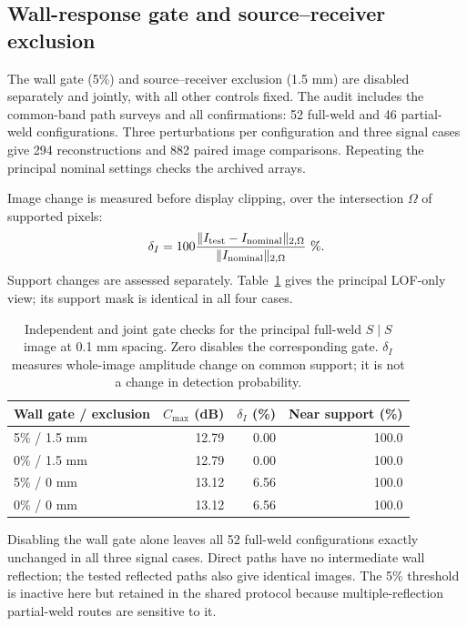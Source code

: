 \subsection{Wall-response gate and source--receiver exclusion}
\label{saftapp:archive:full:gate_audit}
The wall gate (5\%) and source--receiver exclusion (1.5 mm) are disabled separately and jointly, with all other controls fixed. The audit includes the common-band path surveys and all confirmations: 52 full-weld and 46 partial-weld configurations. Three perturbations per configuration and three signal cases give 294 reconstructions and 882 paired image comparisons. Repeating the principal nominal settings checks the archived arrays.

Image change is measured before display clipping, over the intersection $\Omega$ of supported pixels:
\begin{equation}
 \delta_I=100\frac{\lVert I_{\rm test}-I_{\rm nominal}\rVert_{2,\Omega}}
 {\lVert I_{\rm nominal}\rVert_{2,\Omega}}\ \%.
\end{equation}
Support changes are assessed separately. Table~\ref{saftapp:archive:full:gate_controls} gives the principal LOF-only view; its support mask is identical in all four cases.

\begin{table}[htbp]\centering\small
\caption{Independent and joint gate checks for the principal
full-weld $S\mid S${}
image at 0.1 mm spacing. Zero disables the corresponding gate. $\delta_I$ measures whole-image amplitude change on common support; it is not a change in detection probability.}
\label{saftapp:archive:full:gate_controls}
\begin{tabular}{@{}lrrr@{}}\toprule
Wall gate / exclusion & $C_{\max}$ (dB) & $\delta_I$ (\%) & Near support (\%)\\\midrule
5\% / 1.5 mm & 12.79 & 0.00 & 100.0 \\
0\% / 1.5 mm & 12.79 & 0.00 & 100.0 \\
5\% / 0 mm & 13.12 & 6.56 & 100.0 \\
0\% / 0 mm & 13.12 & 6.56 & 100.0 \\

\bottomrule\end{tabular}
\end{table}

Disabling the wall gate alone leaves all 52 full-weld configurations exactly unchanged in all three signal cases. Direct paths have no intermediate wall reflection; the tested reflected paths also give identical images. The 5\% threshold is inactive here but retained in the shared protocol because multiple-reflection partial-weld routes are sensitive to it.

